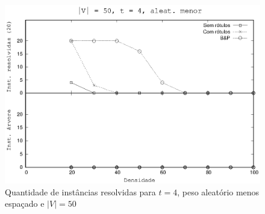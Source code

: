\begin{figure}[t]
  \centering
  \includegraphics[scale=0.65]{figuras/2inst_den-sf4-s50-small_random} %
  \caption{Quantidade de instâncias resolvidas para $t = 4$, peso aleatório menos espaçado e $|V| = 50$}
  \label{fig:2inst_den-sf4-s50-small_random}
\end{figure}

